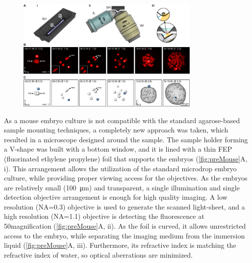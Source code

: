     \begin{figure}[tb]
      \centering
      \includegraphics[width=0.8\textwidth]{mammals/Figure2}
      \label{fig:preMouse}
    \end{figure}

    
    As a mouse embryo culture is not compatible with the standard agarose-based sample mounting techniques, a completely new approach was taken, which resulted in a microscope designed around the sample. The sample holder forming a V-shape was built with a bottom window, and it is lined with a thin FEP (fluorinated ethylene propylene) foil that supports the embryos (\autoref{fig:preMouse}A, i). This arrangement allows the utilization of the standard microdrop embryo culture, while providing proper viewing access for the objectives. As the embryos are relatively small (\SI{100}{\micro m}) and transparent, a single illumination and single detection objective arrangement is enough for high quality imaging. A low resolution (NA=0.3) objective is used to generate the scanned light-sheet, and a high resolution (NA=1.1) objective is detecting the fluorescence at 50\texttimes magnification (\autoref{fig:preMouse}A, ii). As the foil is curved, it allows unrestricted access to the embryo, while separating the imaging medium from the immersion liquid (\autoref{fig:preMouse}A, iii). Furthermore, its refractive index is matching the refractive index of water, so optical aberrations are minimized.

